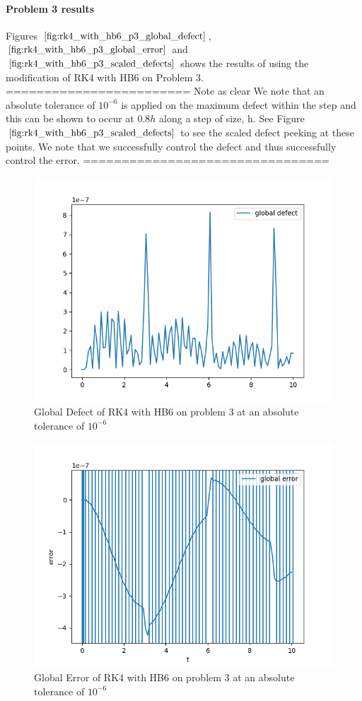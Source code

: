 \documentclass{article}
\begin{document}
\paragraph{Problem 3 results}
Figures $\ref{fig:rk4_with_hb6_p3_global_defect}$, $\ref{fig:rk4_with_hb6_p3_global_error}$ and $\ref{fig:rk4_with_hb6_p3_scaled_defects}$ shows the results of using the modification of RK4 with HB6 on Problem 3. 
======================== Note as clear
We note that an absolute tolerance of $10^{-6}$ is applied on the maximum defect within the step and this can be shown to occur at $0.8h$ along a step of size, h. See Figure $\ref{fig:rk4_with_hb6_p3_scaled_defects}$ to see the scaled defect peeking at these points. We note that we successfully control the defect and thus successfully control the error.
================================

\begin{figure}[H]
\centering
\includegraphics[width=0.7\linewidth]{./figures/rk4_with_hb6_p3_global_defect}
\caption{Global Defect of RK4 with HB6 on problem 3 at an absolute tolerance of $10^{-6}$}
\label{fig:rk4_with_hb6_p3_global_defect}
\end{figure}

\begin{figure}[H]
\centering
\includegraphics[width=0.7\linewidth]{./figures/rk4_with_hb6_p3_global_error}
\caption{Global Error of RK4 with HB6 on problem 3 at an absolute tolerance of $10^{-6}$}
\label{fig:rk4_with_hb6_p3_global_error}
\end{figure}
\end{document}
